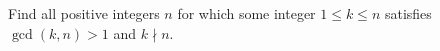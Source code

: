 Find all positive integers $n$ for which some integer $1\le k\le n$ satisfies $\gcd(k,n)>1$ and $k\nmid n$.

